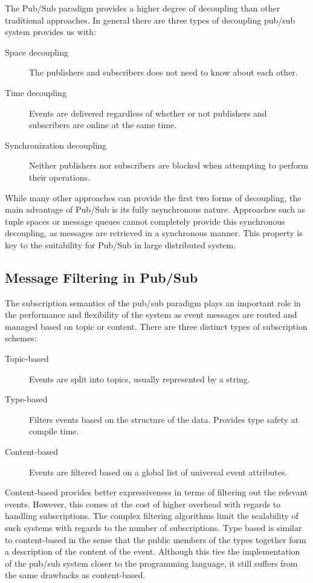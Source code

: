 The Pub/Sub paradigm provides a higher degree of decoupling than other
traditional approaches. In general there are three types of decoupling
pub/sub system provides us with:

\begin{description}
  \item[Space decoupling] The publishers and subscribers does not need to
    know about each other.
  \item[Time decoupling] Events are delivered regardless of whether or
    not publishers and subscribers are online at the same time.
  \item[Synchronization decoupling] Neither publishers nor subscribers
    are blocked when attempting to perform their operations.
\end{description}

While many other approaches can provide the first two forms of
decoupling, the main advantage of Pub/Sub is its fully asynchronous nature.
Approaches such as tuple spaces or message queues cannot completely
provide this synchronous decoupling, as messages are retrieved in a
synchronous manner. This property is key to the suitability for Pub/Sub
in large distributed system.~\cite{Eugster:2003}

\subsection{Message Filtering in Pub/Sub}

The subscription semantics of the pub/sub paradigm plays an important
role in the performance and flexibility of the system as event messages
are routed and managed based on topic or content. There are three
distinct types of subscription schemes:

\begin{description}
  \item[Topic-based] Events are split into topics, usually represented by
      a string.
  \item[Type-based] Filters events based on the structure of the data.
      Provides type safety at compile time.
  \item[Content-based] Events are filtered based on a global
      list of universal event attributes.
\end{description}

Content-based provides better expressiveness in terms of filtering out
the relevant events. However, this comes at the cost of higher overhead
with regards to handling subscriptions. The complex filtering algorithms
limit the scalability of such systems with regards to the number of
subscriptions. Type based is similar to content-based in the sense that
the public members of the types together form a description of the
content of the event. Although this ties the implementation of the
pub/sub system closer to the programming language, it still suffers from
the same drawbacks as content-based.

